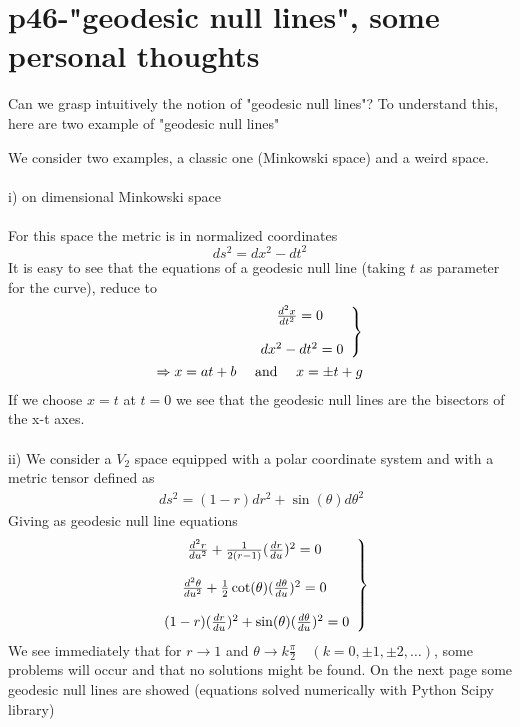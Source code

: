 \section{p46-"geodesic null lines", some personal thoughts}
\begin{tcolorbox}
Can we grasp intuitively the notion of "geodesic null lines"? To understand this, here are two example of "geodesic null lines"
\end{tcolorbox}
We consider two examples, a classic one (Minkowski space) and a weird space.\\\\
i) on dimensional Minkowski space\\\\
For this space the metric is in normalized coordinates $$ ds^2 = dx^2 - dt^2$$
It is easy to see that the equations of a geodesic null line (taking $t$ as parameter for the curve), reduce to \\
\begin{align}
\left. \begin{array}{c}
\dv[2]{x}{t} = 0\\\\
\ dx^2-dt^2 = 0
\end{array} \right \}\\
\Rightarrow x = at+b \quad \text{ and } \quad x = \pm t + g
\end{align}
If we choose $x=t$ at $t=0$ we see that the geodesic null lines are the bisectors of the x-t axes.\\\\
ii) We consider a $V_2$ space equipped with a polar coordinate system and with a metric tensor defined as 
\begin{align}
\ ds^2 = (1-r)dr^2 + \sin(\theta)d \theta ^2
\end{align}
Giving as geodesic null line equations
\begin{align}
\left. \begin{array}{c}
\dv[2]{r}{u} +\frac{1}{2(r-1)}(\dv{r}{u})^2 = 0\\\\
\dv[2]{\theta}{u} +\frac{1}{2}\cot(\theta)(\dv{\theta}{u})^2 = 0\\\\
\ (1-r)(\dv{r}{u})^2+ \sin(\theta)(\dv{\theta}{u})^2 = 0
\end{array} \right \}
\end{align}
We see immediately that for $r \rightarrow 1$ and $ \theta\rightarrow k\frac{\pi}{2} \quad (k= 0, \pm 1, \pm2, \dots)$, some problems will occur and that no solutions might be found. On the next page some geodesic null lines are showed (equations solved numerically with Python Scipy library)
